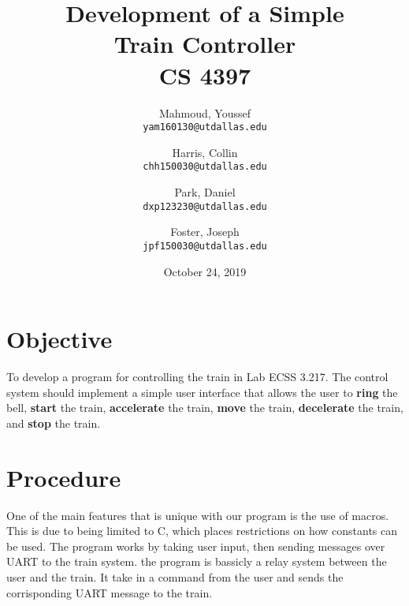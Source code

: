 \documentclass{article}
\author{
	Mahmoud, Youssef\\
	\texttt{yam160130@utdallas.edu}
	\and
	Harris, Collin\\
	\texttt{chh150030@utdallas.edu}
	\and
	Park, Daniel\\
	\texttt{dxp123230@utdallas.edu}
	\and
	Foster, Joseph\\
	\texttt{jpf150030@utdallas.edu}
}
\date{October 24, 2019}
\title{
  \textbf{
    Development of a Simple \\ Train Controller \\ CS 4397
  }
}
\begin{document}
  \maketitle

  \section{Objective}
    To develop a program for controlling the train in Lab ECSS 3.217. The control system
		should implement a simple user interface that allows the user to \textbf{ring} the
		bell, \textbf{start} the train, \textbf{accelerate} the train, \textbf{move} the
		train, \textbf{decelerate} the train, and \textbf{stop} the train.

  \section{Procedure}
	  One of the main features that is unique with our program is the use of macros. This is due to being limited to
	  C, which places restrictions on how constants can be used. The program works by taking user input, then sending messages
	  over UART to the train system. the program is bassicly a relay system between the user and the train. It take in a command 
	  from the user and sends the corrisponding UART message to the train.
\end{document}

